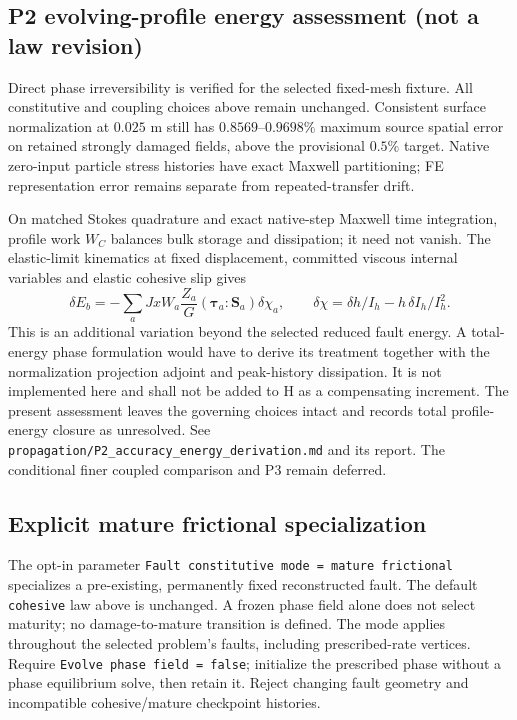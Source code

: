 \documentclass[11pt]{article}
\begin{document}
\subsection{P2 evolving-profile energy assessment (not a law revision)}
Direct phase irreversibility is verified for the selected fixed-mesh fixture.
All constitutive and coupling choices above remain unchanged. Consistent surface
normalization at $0.025$ m still has $0.8569$--$0.9698\%$ maximum source spatial
error on retained strongly damaged fields, above the provisional $0.5\%$ target.
Native zero-input particle stress histories have exact Maxwell partitioning;
FE representation error remains separate from repeated-transfer drift.

On matched Stokes quadrature and exact native-step Maxwell time integration,
profile work $W_C$ balances bulk storage and dissipation; it need not vanish.
The elastic-limit kinematics at fixed displacement, committed viscous internal
variables and elastic cohesive slip gives
\[
 \delta E_b=-\sum_a JxW_a\frac{Z_a}{G}(\boldsymbol\tau_a:\boldsymbol S_a)
                  \delta\chi_a,\qquad
 \delta\chi=\delta h/I_h-h\,\delta I_h/I_h^2.
\]
This is an additional variation beyond the selected reduced fault energy.
A total-energy phase formulation would have to derive its treatment together
with the normalization projection adjoint and peak-history dissipation. It is
not implemented here and shall not be added to H as a compensating increment.
The present assessment leaves the governing choices intact and records total
profile-energy closure as unresolved. See
\texttt{propagation/P2\_accuracy\_energy\_derivation.md} and its report.
The conditional finer coupled comparison and P3 remain deferred.

\subsection{Explicit mature frictional specialization}

The opt-in parameter \texttt{Fault constitutive mode = mature frictional}
specializes a pre-existing, permanently fixed reconstructed fault. The default
\texttt{cohesive} law above is unchanged. A frozen phase field alone does not
select maturity; no damage-to-mature transition is defined. The mode applies
throughout the selected problem's faults, including prescribed-rate vertices.
Require \texttt{Evolve phase field = false}; initialize the prescribed phase
without a phase equilibrium solve, then retain it. Reject changing fault
geometry and incompatible cohesive/mature checkpoint histories.
\end{document}
